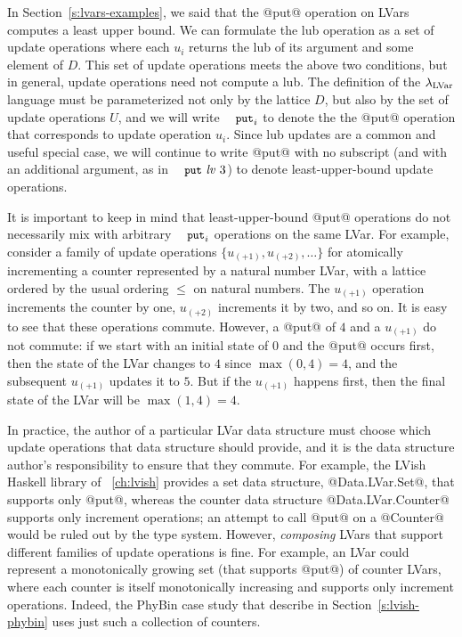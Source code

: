 
In Section~\ref{s:lvars-examples}, we said that the @put@ operation on
LVars computes a least upper bound.  We can formulate the lub
operation as a set of update operations where each $u_i$ returns the
lub of its argument and some element of $D$.  This set of update
operations meets the above two conditions, but in general, update
operations need not compute a lub.  The definition of the
$\lambda_{\textrm{LVar}}$ language must be parameterized not only by the lattice
$D$, but also by the set of update operations $U$, and we will write
$\PUTi$ to denote the the @put@ operation that corresponds to update
operation $u_i$.  Since lub updates are a common and useful special
case, we will continue to write @put@ with no subscript (and with an
additional argument, as in $\putexp{\mathit{lv}}{3}$) to denote
least-upper-bound update operations.

It is important to keep in mind that least-upper-bound @put@
operations do not necessarily mix with arbitrary $\PUTi$ operations on
the same LVar.  For example, consider a family of update operations
$\{ u_{(+1)}, u_{(+2)}, \dots \}$ for atomically incrementing a
counter represented by a natural number LVar, with a lattice ordered
by the usual ordering $\leq$ on natural numbers.  The $u_{(+1)}$
operation increments the counter by one, $u_{(+2)}$ increments it by
two, and so on.  It is easy to see that these operations commute.
However, a @put@ of $4$ and a $u_{(+1)}$ do not commute: if we start
with an initial state of $0$ and the @put@ occurs first, then the
state of the LVar changes to $4$ since $\max(0, 4) = 4$, and the
subsequent $u_{(+1)}$ updates it to $5$.  But if the $u_{(+1)}$
happens first, then the final state of the LVar will be $\max(1, 4) =
4$.

In practice, the author of a particular LVar data structure must
choose which update operations that data structure should provide, and
it is the data structure author's responsibility to ensure that they
commute.  For example, the LVish Haskell library of
~\ref{ch:lvish} provides a set data
structure, @Data.LVar.Set@, that supports only @put@, whereas the
counter data structure @Data.LVar.Counter@ supports only increment
operations; an attempt to call @put@ on a @Counter@ would be ruled out
by the type system.  However, \emph{composing} LVars that support
different families of update operations is fine.  For example, an LVar
could represent a monotonically growing set (that supports @put@) of
counter LVars, where each counter is itself monotonically increasing
and supports only increment operations.  Indeed, the PhyBin case study
that  describe in Section~\ref{s:lvish-phybin} uses just
such a collection of counters.

